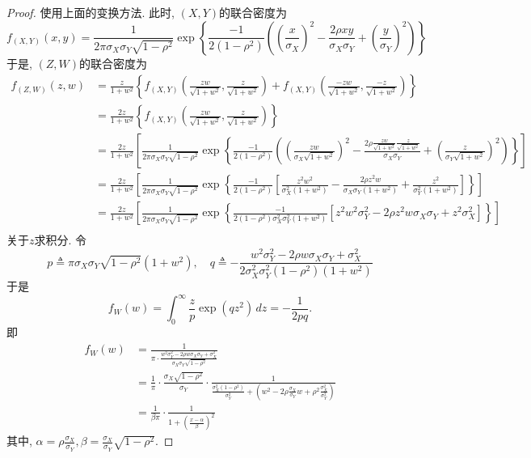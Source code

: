 \documentclass[UTF8, a4paper]{article}
\begin{document}
\begin{proof}
使用上面的变换方法. 此时, \((X,Y)\)的联合密度为
$$
f_{(X, Y)}(x, y)=\frac{1}{2 \pi \sigma_X \sigma_Y \sqrt{1-\rho^2}} \exp \left\{\frac { - 1 } { 2 ( 1 - \rho ^ { 2 } ) } \left(\left(\frac{x}{\sigma_X}\right)^2 -\frac{2 \rho xy}{\sigma_X \sigma_Y}+\left(\frac{y}{\sigma_Y}\right)^2\right)\right\}
$$
于是, \((Z,W)\)的联合密度为 
\begin{align*}
f_{(Z,W)}(z,w) &= \frac{z}{1+w^2}\left\{f_{(X,Y)}\left(\frac{zw}{\sqrt{1+w^2}}, \frac{z}{\sqrt{1+w^2}}\right) + f_{(X,Y)}\left(\frac{-zw}{\sqrt{1+w^2}}, \frac{-z}{\sqrt{1+w^2}}\right)\right\} \\
&= \frac{2z}{1+w^2}\left\{f_{(X,Y)}\left(\frac{zw}{\sqrt{1+w^2}}, \frac{z}{\sqrt{1+w^2}}\right)  \right\} \\
&= \frac{2z}{1+w^2} \left[\frac{1}{2 \pi \sigma_X \sigma_Y \sqrt{1-\rho^2}} \exp \left\{\frac { - 1 } { 2 ( 1 - \rho ^ { 2 } ) } \left(\left(\frac{zw}{\sigma_X\sqrt{1+w^2}}\right)^2 -\frac{2 \rho \frac{zw}{\sqrt{1+w^2}} \frac{z}{\sqrt{1+w^2}}}{\sigma_X \sigma_Y}+\left(\frac{z}{\sigma_Y\sqrt{1+w^2}}\right)^2\right)\right\}\right] \\
&= \frac{2z}{1+w^2} \left[\frac{1}{2 \pi \sigma_X \sigma_Y \sqrt{1-\rho^2}} \exp \left\{\frac{-1}{2(1-\rho^2)} \left[\frac{z^2 w^2}{ \sigma_X^2 (1+w^2)} - \frac{2\rho z^2 w}{\sigma_X \sigma_Y (1 + w^2)} + \frac{z^2}{\sigma_Y^2(1+w^2)}\right]\right\}\right] \\
&= \frac{2z}{1+w^2} \left[\frac{1}{2 \pi \sigma_X \sigma_Y \sqrt{1-\rho^2}} \exp \left\{\frac{-1}{2(1-\rho^2)\sigma_X^2 \sigma_Y^2 (1+w^2)} \left[{z^2 w^2\sigma_Y^2} - {2\rho z^2 w \sigma_X \sigma_Y} + {z^2 \sigma_X^2}\right]\right\}\right] \\
\end{align*}
关于\(z\)求积分. 令
$$
p\triangleq \pi \sigma_X\sigma_Y \sqrt{1-\rho^2}(1+w^2), \quad q \triangleq -\frac{w^2 \sigma_Y^2 - 2\rho w \sigma_X \sigma_Y + \sigma_X^2}{2\sigma_X^2 \sigma_Y^2 (1 - \rho^2)(1 + w^2)}
$$
于是 
$$
f_W(w) = \int_{0}^{\infty} \frac{z}{p} \exp(qz^2) \, dz = -\frac{1}{2pq}.
$$
即 \begin{align*}
    f_W(w) &= \frac{1}{\pi \cdot \frac{w^2 \sigma_Y^2 - 2\rho w \sigma_X \sigma_Y + \sigma_X^2}{\sigma_X \sigma_Y \sqrt{1-\rho^2}}} \\
    &= \frac{1}{{\pi }} \cdot \frac{\sigma_X \sqrt{1-\rho^2}}{\sigma_Y} \cdot \frac{1}{\frac{\sigma_X^2(1 - \rho^2)}{\sigma_Y^2} + \left(w^2 - 2\rho\frac{\sigma_X}{\sigma_Y} w + \rho^2 \frac{\sigma_X^2}{\sigma_Y^2}\right)} \\
    & = \frac{1}{\beta \pi} \cdot \frac{1}{1+ \left(\frac{x-\alpha}{\beta}\right)^2}
\end{align*}
其中, \(\alpha = \rho\frac{\sigma_X}{\sigma_Y}, \beta = \frac{\sigma_X}{\sigma_Y}\sqrt{1 - \rho^2}\).
\end{proof}
\end{document}
